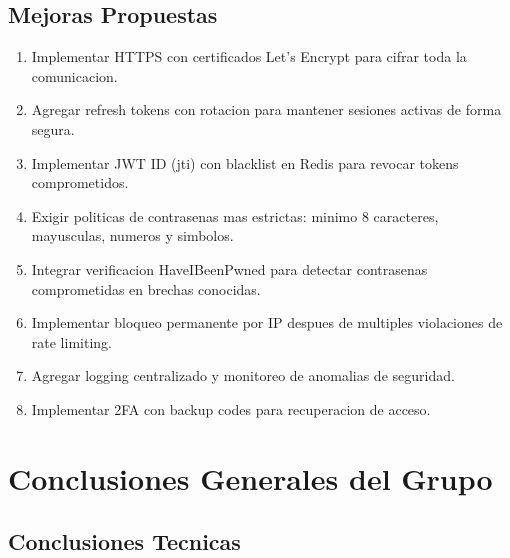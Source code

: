 \documentclass[12pt,a4paper]{article}
\begin{document}
\subsection{Mejoras Propuestas}

\begin{enumerate}[leftmargin=*, itemsep=3pt]
    \item Implementar HTTPS con certificados Let's Encrypt para cifrar toda la comunicacion.
    \item Agregar refresh tokens con rotacion para mantener sesiones activas de forma segura.
    \item Implementar JWT ID (jti) con blacklist en Redis para revocar tokens comprometidos.
    \item Exigir politicas de contrasenas mas estrictas: minimo 8 caracteres, mayusculas, numeros y simbolos.
    \item Integrar verificacion HaveIBeenPwned para detectar contrasenas comprometidas en brechas conocidas.
    \item Implementar bloqueo permanente por IP despues de multiples violaciones de rate limiting.
    \item Agregar logging centralizado y monitoreo de anomalias de seguridad.
    \item Implementar 2FA con backup codes para recuperacion de acceso.
\end{enumerate}

\section{Conclusiones Generales del Grupo}

\subsection{Conclusiones Tecnicas}
\end{document}
